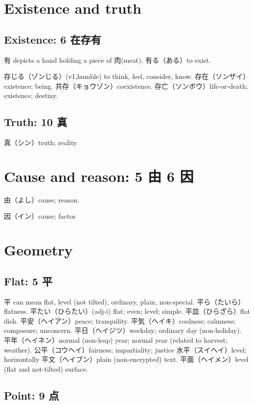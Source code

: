 \section{Existence and truth}

\subsection{Existence: 6 在存有}

有 depicts a hand holding a piece of 肉(meat).
有る（ある）to exist.

存じる（ゾンじる）(v1,humble) to think, feel, consider, know.
存在（ソンザイ）existence; being.
共存（キョウゾン）coexistence.
存亡（ソンボウ）life-or-death; existence; destiny.

\subsection{Truth: 10 真}

真（シン）truth; reality

\section{Cause and reason: 5 由 6 因}

由（よし）cause; reason.

因（イン）cause; factor

\section{Geometry}

\subsection{Flat: 5 平}

平 can mean flat, level (not tilted), ordinary, plain, non-special.
平ら（たいら）flatness.
平たい（ひらたい）(adj-i) flat; even; level; simple.
平皿（ひらざら）flat dish.
平安（ヘイアン）peace; tranquility.
平気（ヘイキ）coolness; calmness; composure; unconcern.
平日（ヘイジツ）weekday; ordinary day (non-holiday).
平年（ヘイネン）normal (non-leap) year; normal year (related to harvest; weather).
公平（コウヘイ）fairness; impartiality; justice
水平（スイヘイ）level; horizontally
平文（ヘイブン）plain (non-encrypted) text.
平面（ヘイメン）level (flat and not-tilted) surface.

\subsection{Point: 9 点}


